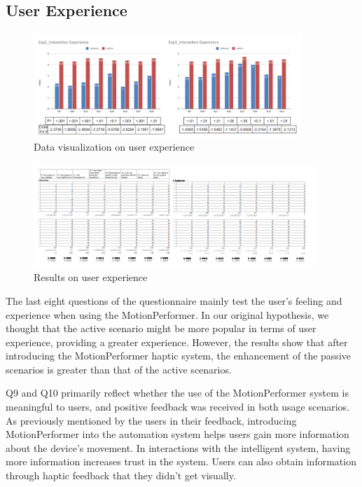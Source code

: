 \subsection{User Experience}

\begin{figure}[h]
\centering
\includegraphics[width=0.9\textwidth]{A_thesis/figures/041.png}
\caption{Data visualization on user experience}
\end{figure}

\begin{figure}[h]
\centering
\includegraphics[width=0.95\textwidth]{A_thesis/figures/015.png}
\caption{Results on user experience}
\end{figure}

The last eight questions of the questionnaire mainly test the user's feeling and experience when using the MotionPerformer. In our original hypothesis, we thought that the active scenario might be more popular in terms of user experience, providing a greater experience. However, the results show that after introducing the MotionPerformer haptic system, the enhancement of the passive scenarios is greater than that of the active scenarios.

Q9 and Q10 primarily reflect whether the use of the MotionPerformer system is meaningful to users, and positive feedback was received in both usage scenarios. As previously mentioned by the users in their feedback, introducing MotionPerformer into the automation system helps users gain more information about the device's movement. In interactions with the intelligent system, having more information increases trust in the system. Users can also obtain information through haptic feedback that they didn't get visually.

